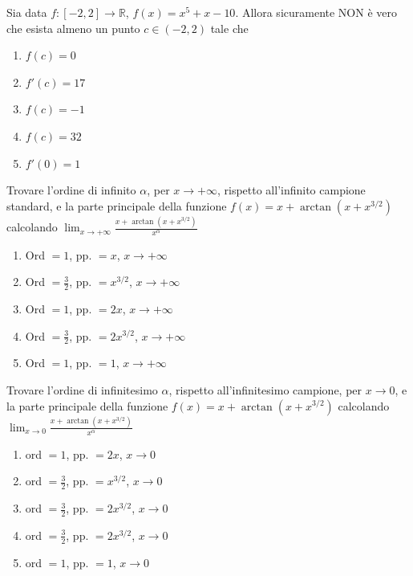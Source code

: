\begin{quiz}
Sia data $f:[-2,2]\to\mathbb R$, $f(x)=x^5+x-10$. Allora sicuramente NON \`e vero che esista almeno un punto $c\in(-2,2)$ tale che
\begin{enumerate}
\item $f(c)=0$
\item $f'(c)=17$
\item $f(c)=-1$
\item $f(c)=32$
\item $f'(0)=1$
\end{enumerate}
\end{quiz}

\begin{quiz}
Trovare l'ordine di infinito $\alpha$, per $x\to+\infty$, rispetto all'infinito campione standard, e la parte principale della funzione $f(x)=x+\arctan\left(x+x^{3/2}\right)$ calcolando $\displaystyle\lim_{x\to+\infty}\frac{x+\arctan(x+x^{3/2})}{x^\alpha}$
\begin{enumerate}
\item Ord $=1$, pp. $=x$, $x\to+\infty$
\item Ord $=\frac32$, pp. $=x^{3/2}$, $x\to+\infty$
\item Ord $=1$, pp. $=2x$, $x\to+\infty$
\item Ord $=\frac32$, pp. $=2x^{3/2}$, $x\to+\infty$
\item Ord $=1$, pp. $=1$, $x\to+\infty$
\end{enumerate}
\end{quiz}

\begin{quiz}
Trovare l'ordine di infinitesimo $\alpha$, rispetto all'infinitesimo campione, per $x\to0$, e la parte principale della funzione $f(x)=x+\arctan\left(x+x^{3/2}\right)$ calcolando $\displaystyle\lim_{x\to0}\frac{x+\arctan(x+x^{3/2})}{x^\alpha}$
\begin{enumerate}
\item ord $=1$, pp. $=2x$, $x\to0$
\item ord $=\frac32$, pp. $=x^{3/2}$, $x\to0$
\item ord $=\frac32$, pp. $=2x^{3/2}$, $x\to0$
\item ord $=\frac32$, pp. $=2x^{3/2}$, $x\to0$
\item ord $=1$, pp. $=1$, $x\to0$
\end{enumerate}
\end{quiz}

